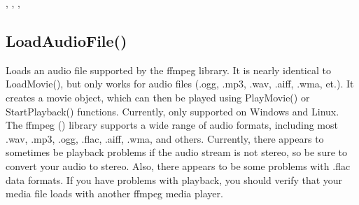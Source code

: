 \documentclass[letterpaper,10pt,english]{sphinxmanual}
\begin{document}
\sphinxAtStartPar
{}, , , 

\ignorespaces 

\subsection{LoadAudioFile()}
\label{\detokenize{reference/peblobjects:loadaudiofile}}\label{\detokenize{reference/peblobjects:index-17}}
\sphinxAtStartPar
{}

\sphinxAtStartPar
{}

\sphinxAtStartPar
Loads an audio file supported by  the ffmpeg library.  It is nearly identical to LoadMovie(), but only works for audio files (.ogg, .mp3, .wav, .aiff, .wma, et.).  It creates a movie object, which can then be played using PlayMovie() or StartPlayback() functions.  Currently, only supported on Windows and Linux.  The ffmpeg () library supports a wide range of audio formats, including most .wav, .mp3, .ogg, .flac, .aiff, .wma, and others.   Currently, there appears to sometimes be playback problems if the audio stream is not stereo, so be sure to convert your audio to stereo. Also, there appears to be some problems with .flac data formats.  If you have problems with playback,  you should verify that your media file loads with another ffmpeg media player.

\sphinxAtStartPar
{}

\begin{sphinxVerbatim}[commandchars=\\\{\}]
\end{sphinxVerbatim}

\sphinxAtStartPar
{}

\begin{sphinxVerbatim}[commandchars=\\\{\}]
\end{sphinxVerbatim}
\end{document}
